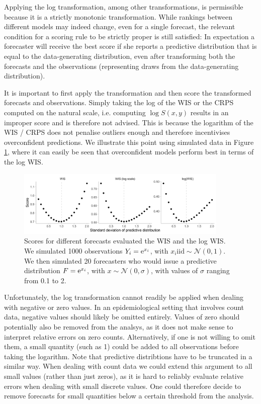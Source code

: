 \documentclass{article}
\begin{document}
Applying the log transformation, among other transformations, is permissible because it is a strictly monotonic transformation. While rankings between different models may indeed change, even for a single forecast, the relevant condition for a scoring rule to be strictly proper is still satisfied: In expectation a forecaster will receive the best score if she reports a predictive distribution that is equal to the data-generating distribution, even after transforming both the forecasts and the observations (representing draws from the data-generating distribution). 

It is important to first apply the transformation and then score the transformed forecasts and observations. Simply taking the log of the WIS or the CRPS computed on the natural scale, i.e. computing $\log S(x, y)$ results in an improper score and is therefore not advised. This is because the logarithm of the WIS / CRPS does not penalise outliers enough and therefore incentivises overconfident predictions. We illustrate this point using simulated data in Figure \ref{fig:log-improper}, where it can easily be seen that overconfident models perform best in terms of the log WIS. 

\begin{figure}[h!]
    \centering
    \includegraphics[width=0.9\textwidth]{output/figures/example-log-first.png}
    \caption{Scores for different forecasts evaluated the WIS and the log WIS. We simulated 1000 observations $Y_i = {\rm e}^{x_i}$, with $x_i \text{iid} \sim \mathcal{N}(0, 1)$. We then simulated 20 forecasters who would issue a predictive distribution $F = {\rm e}^{x_i}$, with $x \sim \mathcal{N}(0, \sigma)$, with values of $\sigma$ ranging from 0.1 to 2.}
    \label{fig:log-improper}
\end{figure}


Unfortunately, the log transformation cannot readily be applied when dealing with negative or zero values. In an epidemiological setting that involves count data, negative values should likely be omitted entirely. Values of zero should potentially also be removed from the analsys, as it does not make sense to interpret relative errors on zero counts. Alternatively, if one is not willing to omit them, a small quantity (such as 1) could be added to all observations before taking the logarithm. Note that predictive distribtions have to be truncated in a similar way. When dealing with count data we could extend this argument to all small values (rather than just zeros), as it is hard to reliably evaluate relative errors when dealing with small discrete values. One could therefore decide to remove forecasts for small quantities below a certain threshold from the analysis. 
\end{document}
